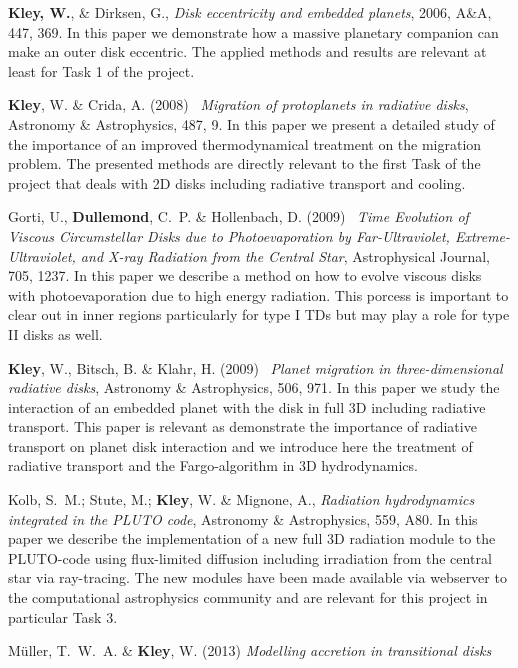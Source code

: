 \documentclass[10pt,fleqn,twoside]{article}
\begin{document}
\begin{literature}
\item {\bf Kley, W.}, \& Dirksen, G., {\em Disk eccentricity and embedded
    planets}, 2006, A\&A, 447, 369. In this paper we
  demonstrate how a massive planetary companion can make an outer disk eccentric. The applied
  methods and results are relevant at least for Task 1 of the project.
\item
 {\bf Kley}, W. \& {Crida}, A. (2008) \, {\it Migration of protoplanets in radiative disks},
   Astronomy \& Astrophysics, 487, 9.
  In this paper we present a detailed study of the importance of an improved thermodynamical
  treatment on the migration problem. The presented methods are directly relevant to the
  first Task of the project that deals with 2D disks including radiative transport and cooling.
\item {Gorti}, U., {\bf Dullemond}, C.~P. \& {Hollenbach}, D. (2009) \,
  {\it Time Evolution of Viscous Circumstellar Disks due to Photoevaporation by Far-Ultraviolet, 
   Extreme-Ultraviolet, and X-ray Radiation from the Central Star},
  Astrophysical Journal, 705, 1237.
  In this paper we describe a method on how to evolve viscous disks with photoevaporation
  due to high energy radiation. This porcess is important to clear out in inner regions particularly
  for type I TDs but may play a role for type II disks as well.
\item
  {\bf Kley}, W., {Bitsch}, B. \& {Klahr}, H. (2009) \,
  {\it Planet migration in three-dimensional radiative disks},
  Astronomy \& Astrophysics, 506, 971. 
  In this paper we study the interaction of an embedded planet with the disk in full 3D including radiative
  transport. This paper is relevant as demonstrate the importance of radiative transport on 
  planet disk interaction and we introduce here the treatment of radiative transport and the Fargo-algorithm
  in 3D hydrodynamics.  
\item
  {Kolb}, S.~M.; {Stute}, M.; {\bf Kley}, W. \& {Mignone}, A., 
  {\it Radiation hydrodynamics integrated in the PLUTO code},
   Astronomy \& Astrophysics, 559, A80. In this paper we describe the implementation of a new
   full 3D radiation module to the PLUTO-code using flux-limited diffusion including irradiation
   from the central star via ray-tracing. The new modules have been made available via webserver to
   the computational astrophysics community and are relevant for this project in particular Task 3.
\item
  {M{\"u}ller}, T.~W.~A. \& {\bf Kley}, W. (2013) {\it Modelling accretion in transitional disks}

\end{literature}
\end{document}
